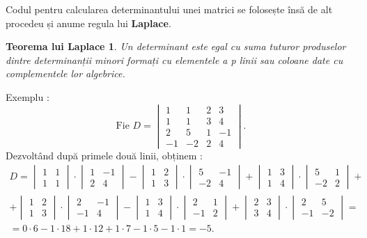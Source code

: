 Codul pentru calcularea determinantului unei matrici se folosește însă de alt
procedeu și anume regula lui \textbf{Laplace}.
\newtheorem{th_laplace_rule}{Teorema lui Laplace}
\begin{th_laplace_rule}
Un determinant este egal cu suma tuturor produselor dintre determinanții minori
formați cu elementele a \textit{p} linii sau coloane date cu complementele lor
algebrice.
\end{th_laplace_rule}
Exemplu :
\begin{equation*}
\text{Fie } D = 
\begin{vmatrix}
1 & 1 & 2 & 3 \\
1 & 1 & 3 & 4 \\
2 & 5 & 1 & -1 \\
-1 & -2 & 2 & 4
\end{vmatrix}.
\end{equation*}
Dezvoltând după primele două linii, obținem :
\begin{align*}
D =
\begin{vmatrix}
1 & 1 \\
1 & 1
\end{vmatrix} \cdot
\begin{vmatrix}
1 & -1 \\
2 & 4
\end{vmatrix} -
\begin{vmatrix}
1 & 2 \\
1 & 3
\end{vmatrix} \cdot
\begin{vmatrix}
5 & -1 \\
-2 & 4
\end{vmatrix} +
\begin{vmatrix}
1 & 3 \\
1 & 4
\end{vmatrix} \cdot
\begin{vmatrix}
5 & 1 \\
-2 & 2
\end{vmatrix} + \\ +
\begin{vmatrix}
1 & 2 \\
1 & 3
\end{vmatrix} \cdot
\begin{vmatrix}
2 & -1 \\
-1 & 4
\end{vmatrix} -
\begin{vmatrix}
1 & 3 \\
1 & 4
\end{vmatrix} \cdot
\begin{vmatrix}
2 & 1 \\
-1 & 2
\end{vmatrix} +
\begin{vmatrix}
2 & 3 \\
3 & 4
\end{vmatrix} \cdot
\begin{vmatrix}
2 & 5 \\
-1 & -2
\end{vmatrix} = \\
= 0 \cdot 6 - 1 \cdot 18 + 1 \cdot 12 + 1 \cdot 7 - 1 \cdot 5 - 1 \cdot 1
= -5.
\end{align*}

